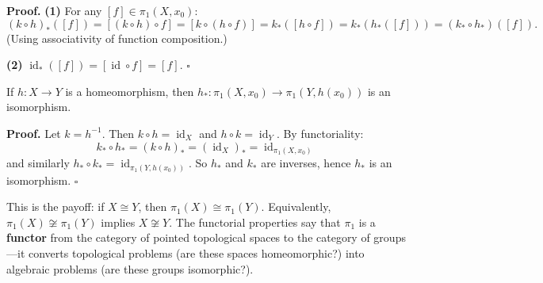 \documentclass[11pt]{report}
\renewenvironment{proof}[1][Proof]{\noindent\textbf{#1.} }{\hfill$\square$\par\vspace{5pt}}
\begin{document}
\begin{proof}
\textbf{(1)} For any $[f] \in \pi_1(X, x_0)$:
\[(k \circ h)_*([f]) = [(k \circ h) \circ f] = [k \circ (h \circ f)] = k_*([h \circ f]) = k_*(h_*([f])) = (k_* \circ h_*)([f]).\]
(Using associativity of function composition.)

\textbf{(2)} $\operatorname{id}_*([f]) = [\operatorname{id} \circ f] = [f]$.
\end{proof}

\begin{corbox}
If $h: X \to Y$ is a homeomorphism, then $h_*: \pi_1(X, x_0) \to \pi_1(Y, h(x_0))$ is an isomorphism.
\end{corbox}

\begin{proof}
Let $k = h^{-1}$. Then $k \circ h = \operatorname{id}_X$ and $h \circ k = \operatorname{id}_Y$. By functoriality:
\[k_* \circ h_* = (k \circ h)_* = (\operatorname{id}_X)_* = \operatorname{id}_{\pi_1(X, x_0)}\]
and similarly $h_* \circ k_* = \operatorname{id}_{\pi_1(Y, h(x_0))}$. So $h_*$ and $k_*$ are inverses, hence $h_*$ is an isomorphism.
\end{proof}

\begin{rembox}
This is the payoff: if $X \cong Y$, then $\pi_1(X) \cong \pi_1(Y)$. Equivalently, $\pi_1(X) \not\cong \pi_1(Y)$ implies $X \not\cong Y$. The functorial properties say that $\pi_1$ is a \textbf{functor} from the category of pointed topological spaces to the category of groups---it converts topological problems (are these spaces homeomorphic?) into algebraic problems (are these groups isomorphic?).
\end{rembox}
\end{document}
